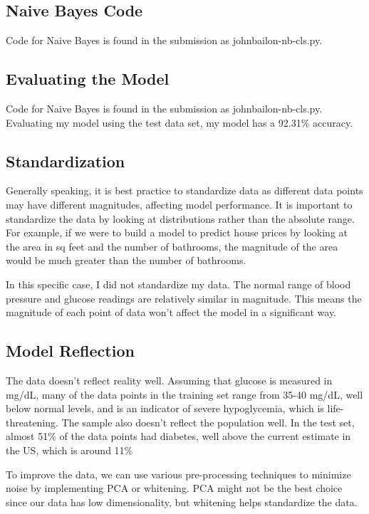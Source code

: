 \documentclass{article}
\begin{document}
\subsection{Naive Bayes Code}
Code for Naive Bayes is found in the submission as johnbailon-nb-cls.py. 

\subsection{Evaluating the Model}
Code for Naive Bayes is found in the submission as johnbailon-nb-cls.py. Evaluating my model using the test data set, my model has a 92.31\% accuracy.

\subsection{Standardization}
 Generally speaking, it is best practice to standardize data as different data points may have different magnitudes, affecting model performance. It is important to standardize the data by looking at distributions rather than the absolute range. For example, if we were to build a model to predict house prices by looking at the area in sq feet and the number of bathrooms, the magnitude of the area would be much greater than the number of bathrooms. 

 In this specific case, I did not standardize my data. The normal range of blood pressure and glucose readings are relatively similar in magnitude. This means the magnitude of each point of data won't affect the model in a significant way.
 

\subsection{Model Reflection}
The data doesn't reflect reality well. Assuming that glucose is measured in mg/dL, many of the data points in the training set range from 35-40 mg/dL, well below normal levels, and is an indicator of severe hypoglycemia, which is life-threatening. The sample also doesn't reflect the population well. In the test set, almost 51\% of the data points had diabetes, well above the current estimate in the US, which is around 11\%  

To improve the data, we can use various pre-processing techniques to minimize noise by implementing PCA or whitening. PCA might not be the best choice since our data has low dimensionality, but whitening helps standardize the data. 

\newpage
\end{document}
